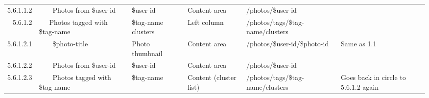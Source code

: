 \documentclass[12pt,a4paper]{article}
\begin{document}
\begin{landscape}
\begin{table}[h!b!p!]
\begin{center}
\begin{tiny}
\begin{tabular}{r|l|l|l|l|p{3cm}}
                    5.6.1.1.2 &
                    ~~~~Photos from \$user-id &
                    \$user-id &
                    Content area &
                    /photos/\$user-id &
                    \\

                  5.6.1.2 &
                  ~~~Photos tagged with \$tag-name &
                  \$tag-name clusters &
                  Left column &
                  /photos/tags/\$tag-name/clusters &
                  \\

                    5.6.1.2.1 &
                    ~~~~\$photo-title &
                    Photo thumbnail &
                    Content area &
                    /photos/\$user-id/\$photo-id &
                    Same as 1.1 \\

                    5.6.1.2.2 &
                    ~~~~Photos from \$user-id &
                    \$user-id &
                    Content area &
                    /photos/\$user-id &
                    \\

                    5.6.1.2.3 &
                    ~~~~Photos tagged with \$tag-name &
                    \$tag-name &
                    Content (cluster list) &
                    /photos/tags/\$tag-name/clusters &
                    Goes back in circle to 5.6.1.2 again \\

          \end{tabular}
        \rm
      \end{tiny}
    \end{center}
  \end{table}
\end{landscape}
\end{document}
